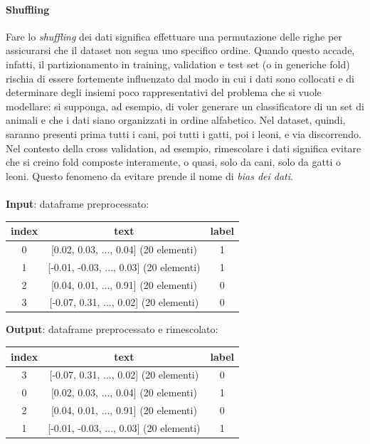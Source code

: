 \documentclass[12pt]{report}
\theoremstyle{definition}
\begin{document}
\paragraph{Shuffling}
Fare lo \textit{shuffling} dei dati significa effettuare una permutazione delle righe per assicurarsi che il dataset non segua uno specifico ordine. Quando questo accade, infatti, il partizionamento in training, validation e test set (o in generiche fold) rischia di essere fortemente influenzato dal modo in cui i dati sono collocati e di determinare degli insiemi poco rappresentativi del problema che si vuole modellare: si supponga, ad esempio, di voler generare un classificatore di un set di animali e che i dati siano organizzati in ordine alfabetico. Nel dataset, quindi, saranno presenti prima tutti i cani, poi tutti i gatti, poi i leoni, e via discorrendo. Nel contesto della cross validation, ad esempio, rimescolare i dati significa evitare che si creino fold composte interamente, o quasi, solo da cani, solo da gatti o leoni. Questo fenomeno da evitare prende il nome di \textit{bias dei dati}.
\\
\\
\textbf{Input}: dataframe preprocessato:
\begin{center}
    \begin{tabular}{|c|c|c|}
    \hline
    \textbf{index} & \textbf{text} & \textbf{label} \\
    \hline
         0 & [0.02, 0.03, ..., 0.04] (20 elementi) & 1 \\
         1 & [-0.01, -0.03, ..., 0.03] (20 elementi) & 1 \\
         2 & [0.04, 0.01, ..., 0.91] (20 elementi) & 0 \\
         3 & [-0.07, 0.31, ..., 0.02] (20 elementi) & 0 \\
    \hline
    \end{tabular}
\end{center}
\textbf{Output}: dataframe preprocessato e rimescolato:
\begin{center}
    \begin{tabular}{|c|c|c|}
    \hline
    \textbf{index} & \textbf{text} & \textbf{label} \\
    \hline
        3 & [-0.07, 0.31, ..., 0.02] (20 elementi) & 0 \\
        0 & [0.02, 0.03, ..., 0.04] (20 elementi) & 1 \\
        2 & [0.04, 0.01, ..., 0.91] (20 elementi) & 0 \\
        1 & [-0.01, -0.03, ..., 0.03] (20 elementi) & 1 \\
    \hline
    \end{tabular}
\end{center}
\end{document}

